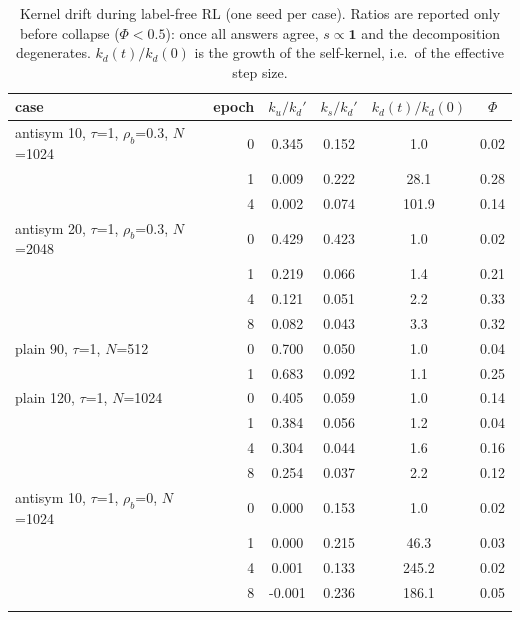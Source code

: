 \begin{table}[h]
\centering\small
\caption{Kernel drift during label-free RL (one seed per case). Ratios are reported only before collapse ($\Phi<0.5$): once all answers agree, $s\propto\mathbf 1$ and the decomposition degenerates. $k_d(t)/k_d(0)$ is the growth of the self-kernel, i.e.\ of the effective step size.}
\label{tab:drift}
\begin{tabular}{lrcccc}
\toprule
case & epoch & $k_u/k_d'$ & $k_s/k_d'$ & $k_d(t)/k_d(0)$ & $\Phi$ \\
\midrule
antisym 10, $\tau$=1, $\rho_b$=0.3, $N$=1024 & 0 & 0.345 & 0.152 & 1.0 & 0.02 \\
 & 1 & 0.009 & 0.222 & 28.1 & 0.28 \\
 & 4 & 0.002 & 0.074 & 101.9 & 0.14 \\
\addlinespace
antisym 20, $\tau$=1, $\rho_b$=0.3, $N$=2048 & 0 & 0.429 & 0.423 & 1.0 & 0.02 \\
 & 1 & 0.219 & 0.066 & 1.4 & 0.21 \\
 & 4 & 0.121 & 0.051 & 2.2 & 0.33 \\
 & 8 & 0.082 & 0.043 & 3.3 & 0.32 \\
\addlinespace
plain 90, $\tau$=1, $N$=512 & 0 & 0.700 & 0.050 & 1.0 & 0.04 \\
 & 1 & 0.683 & 0.092 & 1.1 & 0.25 \\
\addlinespace
plain 120, $\tau$=1, $N$=1024 & 0 & 0.405 & 0.059 & 1.0 & 0.14 \\
 & 1 & 0.384 & 0.056 & 1.2 & 0.04 \\
 & 4 & 0.304 & 0.044 & 1.6 & 0.16 \\
 & 8 & 0.254 & 0.037 & 2.2 & 0.12 \\
\addlinespace
antisym 10, $\tau$=1, $\rho_b$=0, $N$=1024 & 0 & 0.000 & 0.153 & 1.0 & 0.02 \\
 & 1 & 0.000 & 0.215 & 46.3 & 0.03 \\
 & 4 & 0.001 & 0.133 & 245.2 & 0.02 \\
 & 8 & -0.001 & 0.236 & 186.1 & 0.05 \\
\addlinespace
\bottomrule
\end{tabular}
\end{table}
